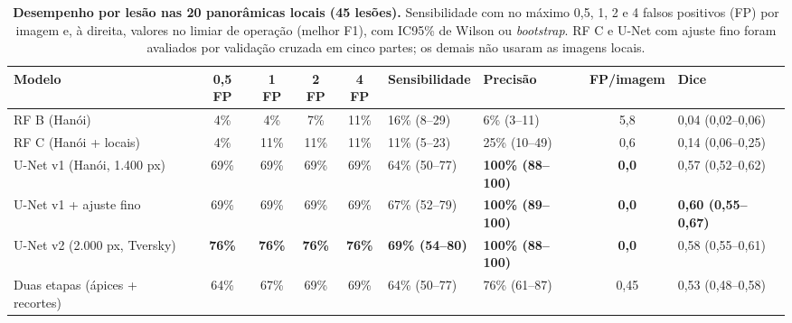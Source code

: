 \documentclass[twocolumn]{article}
\begin{document}

\begin{table}[!t]
\caption{\textbf{Desempenho por lesão nas 20 panorâmicas locais (45 lesões).} Sensibilidade com no máximo 0,5, 1, 2 e 4 falsos positivos (FP) por imagem e, à direita, valores no limiar de operação (melhor F1), com IC95\% de Wilson ou \textit{bootstrap}. RF C e U-Net com ajuste fino foram avaliados por validação cruzada em cinco partes; os demais não usaram as imagens locais.}
\centering\tablefont
\begin{tabularx}{\textwidth}{L *{4}{c} Y Y c Y}
\toprule
Modelo & 0,5 FP & 1 FP & 2 FP & 4 FP & Sensibilidade & Precisão & FP/imagem & Dice \\
\midrule
RF B (Hanói) & 4\% & 4\% & 7\% & 11\% & 16\% (8--29) & 6\% (3--11) & 5,8 & 0,04 (0,02--0,06) \\
RF C (Hanói + locais) & 4\% & 11\% & 11\% & 11\% & 11\% (5--23) & 25\% (10--49) & 0,6 & 0,14 (0,06--0,25) \\
U-Net v1 (Hanói, 1.400 px) & 69\% & 69\% & 69\% & 69\% & 64\% (50--77) & \textbf{100\% (88--100)} & \textbf{0,0} & 0,57 (0,52--0,62) \\
U-Net v1 + ajuste fino & 69\% & 69\% & 69\% & 69\% & 67\% (52--79) & \textbf{100\% (89--100)} & \textbf{0,0} & \textbf{0,60 (0,55--0,67)} \\
U-Net v2 (2.000 px, Tversky) & \textbf{76\%} & \textbf{76\%} & \textbf{76\%} & \textbf{76\%} & \textbf{69\% (54--80)} & \textbf{100\% (88--100)} & \textbf{0,0} & 0,58 (0,55--0,61) \\
Duas etapas (ápices + recortes) & 64\% & 67\% & 69\% & 69\% & 64\% (50--77) & 76\% (61--87) & 0,45 & 0,53 (0,48--0,58) \\
\bottomrule
\end{tabularx}
\end{table}
\end{document}
